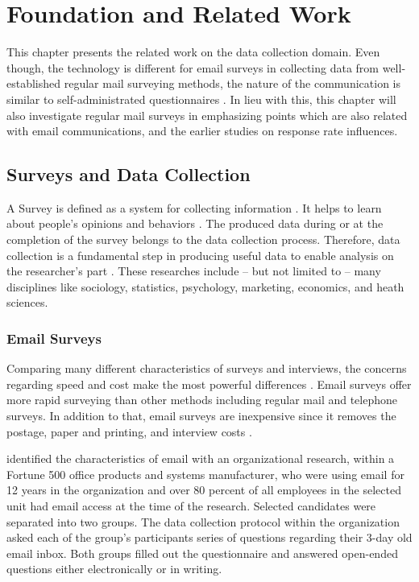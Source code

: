 \chapter{Foundation and Related Work}
\label{chp:FouRelWor}
This chapter presents the related work on the data collection domain. Even though, the technology is different for email surveys in collecting data from well-established regular mail surveying methods, the nature of the communication is similar to self-administrated questionnaires \citep{Schaefer1998}. In lieu with this, this chapter will also investigate regular mail surveys in emphasizing points which are also related with email communications, and the earlier studies on response rate influences.

\section{Surveys and Data Collection}
\label{sec:1:SurDatCol}
A Survey is defined as a system for collecting information \citep[page 3]{Sue2011}. It helps to learn about people's opinions and behaviors \citep{DillmanDonA.SmythJoleneD.Christian2009}. The produced data during or at the completion of the survey belongs to the data collection process. Therefore, data collection is a fundamental step in producing useful data to enable analysis on the researcher's part \citep[page 149]{Groves2009}. These researches include -- but not limited to -- many disciplines like sociology, statistics, psychology, marketing, economics, and heath sciences. 

\subsection{Email Surveys}
\label{sec:2.1.1:EmaSur}

Comparing many different characteristics of surveys and interviews, the concerns regarding speed and cost make the most powerful differences \citep{Sproull1986, Schaefer1998}. Email surveys offer more rapid surveying than other methods including regular mail and telephone surveys. In addition to that, email surveys are inexpensive since it removes the postage, paper and printing, and interview costs \citep{Schaefer1998}.
\vspace{1cm}

\cite{Sproull1986} identified the characteristics of email with an organizational research, within a Fortune 500 office products and systems manufacturer, who were using email for 12 years in the organization and over 80 percent of all employees in the selected unit had email access at the time of the research. Selected candidates were separated into two groups. The data collection protocol within the organization asked each of the group's participants series of questions regarding their 3-day old email inbox. Both groups filled out the questionnaire and answered open-ended questions either electronically or in writing.
\vspace{1cm}

